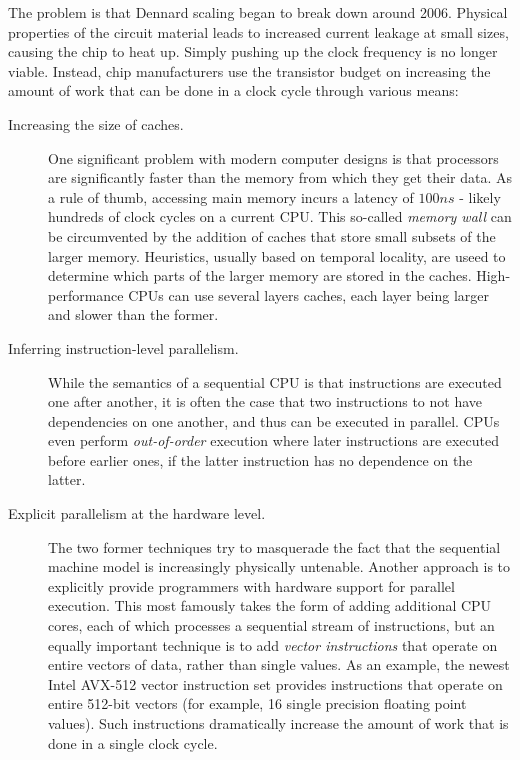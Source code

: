 The problem is that Dennard scaling began to break down around 2006.
Physical properties of the circuit material leads to increased current
leakage at small sizes, causing the chip to heat up.  Simply pushing
up the clock frequency is no longer viable.  Instead, chip
manufacturers use the transistor budget on increasing the amount of
work that can be done in a clock cycle through various means:

\begin{description}
\item[Increasing the size of caches.] One significant problem with
  modern computer designs is that processors are significantly faster
  than the memory from which they get their data.  As a rule of thumb,
  accessing main memory incurs a latency of $100ns$ - likely hundreds
  of clock cycles on a current CPU.  This so-called \textit{memory
    wall} can be circumvented by the addition of caches that store
  small subsets of the larger memory.  Heuristics, usually based on
  temporal locality, are useed to determine which parts of the larger
  memory are stored in the caches.  High-performance CPUs can use
  several layers caches, each layer being larger and slower than the
  former.
\item[Inferring instruction-level parallelism.]  While the semantics
  of a sequential CPU is that instructions are executed one after
  another, it is often the case that two instructions to not have
  dependencies on one another, and thus can be executed in parallel.
  CPUs even perform \textit{out-of-order} execution where later
  instructions are executed before earlier ones, if the latter
  instruction has no dependence on the latter.
\item[Explicit parallelism at the hardware level.]  The two former
  techniques try to masquerade the fact that the sequential machine
  model is increasingly physically untenable.  Another approach is to
  explicitly provide programmers with hardware support for parallel
  execution.  This most famously takes the form of adding additional
  CPU cores, each of which processes a sequential stream of
  instructions, but an equally important technique is to add
  \textit{vector instructions} that operate on entire vectors of data,
  rather than single values.  As an example, the newest Intel AVX-512
  vector instruction set provides instructions that operate on entire
  512-bit vectors (for example, 16 single precision floating point
  values).  Such instructions dramatically increase the amount of work
  that is done in a single clock cycle.
\end{description}

